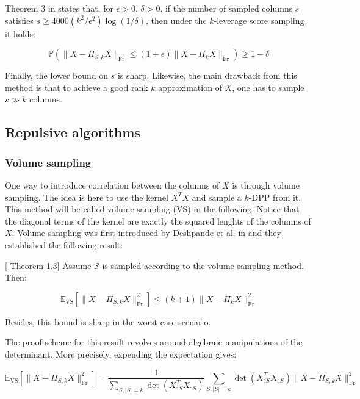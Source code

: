 Theorem 3 in \cite{drineas_relative-error_2008} states that, for $\epsilon>0$, $\delta > 0$, if the number of sampled columns $s$ satisfies $s \geq 4000(k^2/\epsilon^2)\log(1/\delta)$, then under the $k$-leverage score sampling it holds:

    \[ \mathbb{P}( \lVert X - \Pi_{S,k}X \rVert_{\operatorname{Fr}} \leq (1+ \epsilon) \lVert X - \Pi_kX \rVert_{\operatorname{Fr}}) \geq 1 - \delta \]

Finally, the lower bound on $s$ is sharp.
Likewise, the main drawback from this method is that to achieve a good rank $k$ approximation of $X$, one has to sample $s \gg k$ columns. 



\subsection{Repulsive algorithms} 

\subsubsection{Volume sampling}

One way to introduce correlation between the columns of $X$ is through volume sampling. The idea is here to use the kernel $X^TX$ and sample a $k$-DPP from it. This method will be called volume sampling (VS) in the following. Notice that the diagonal terms of the kernel are exactly the squared lenghts of the columns of $X$.
Volume sampling was first introduced by Deshpande et al. in \cite{deshpande_matrix_2006} and they established the following result:

\begin{proposition} \label{prop:VS} [\cite{deshpande_matrix_2006} Theorem 1.3]
    Assume $\mathcal{S}$ is sampled according to the volume sampling method. Then:
 
\begin{equation}
 \mathbb{E}_{\operatorname{VS}} [\lVert X - \Pi_{S,k}X \rVert_{\operatorname{Fr}}^2] \leq (k+1) \lVert X - \Pi_k X \rVert_{\operatorname{Fr}}^2 
\end{equation}

Besides, this bound is sharp in the worst case scenario.
\end{proposition}

The proof scheme for this result revolves around algebraic manipulations of the determinant. More precisely, expending the expectation gives: 

\[ \mathbb{E}_{\operatorname{VS}} [\lVert X - \Pi_{S,k}X \rVert_{\operatorname{Fr}}^2] = \dfrac{1}{\sum \limits_{S, \lvert S \rvert = k } \operatorname{det}(X_{:S}^TX_{:S})} \sum \limits_{S, \lvert S \rvert = k } \operatorname{det}(X_{:S}^TX_{:S} ) \lVert X - \Pi_{S,k}X \rVert_{\operatorname{Fr}}^2 \]

